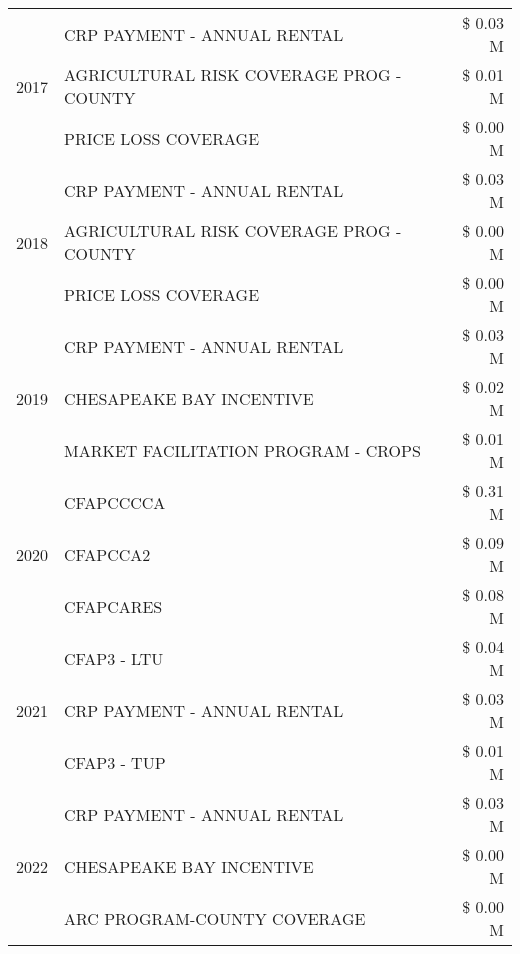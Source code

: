\begin{tabular}{llr}
\cline{1-3}
\multirow[t]{3}{*}{2017} & CRP PAYMENT - ANNUAL RENTAL & \$ 0.03 M \\
 & AGRICULTURAL RISK COVERAGE PROG - COUNTY & \$ 0.01 M \\
 & PRICE LOSS COVERAGE & \$ 0.00 M \\
\cline{1-3}
\multirow[t]{3}{*}{2018} & CRP PAYMENT - ANNUAL RENTAL & \$ 0.03 M \\
 & AGRICULTURAL RISK COVERAGE PROG - COUNTY & \$ 0.00 M \\
 & PRICE LOSS COVERAGE & \$ 0.00 M \\
\cline{1-3}
\multirow[t]{3}{*}{2019} & CRP PAYMENT - ANNUAL RENTAL & \$ 0.03 M \\
 & CHESAPEAKE BAY INCENTIVE & \$ 0.02 M \\
 & MARKET FACILITATION PROGRAM - CROPS & \$ 0.01 M \\
\cline{1-3}
\multirow[t]{3}{*}{2020} & CFAPCCCCA & \$ 0.31 M \\
 & CFAPCCA2 & \$ 0.09 M \\
 & CFAPCARES & \$ 0.08 M \\
\cline{1-3}
\multirow[t]{3}{*}{2021} & CFAP3 - LTU & \$ 0.04 M \\
 & CRP PAYMENT - ANNUAL RENTAL & \$ 0.03 M \\
 & CFAP3 - TUP & \$ 0.01 M \\
\cline{1-3}
\multirow[t]{3}{*}{2022} & CRP PAYMENT - ANNUAL RENTAL & \$ 0.03 M \\
 & CHESAPEAKE BAY INCENTIVE & \$ 0.00 M \\
 & ARC PROGRAM-COUNTY COVERAGE & \$ 0.00 M \\
\cline{1-3}
\bottomrule
\end{tabular}
